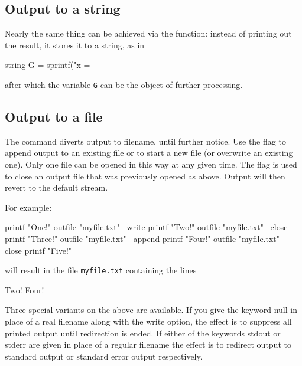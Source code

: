 \subsection{Output to a string}
\label{sec:sprintf}

Nearly the same thing can be achieved via the  function:
instead of printing out the result, it stores it to a string, as in 
\begin{code}
  string G = sprintf("x = %
\end{code}
after which the variable \texttt{G} can be the object of further
processing.


\subsection{Output to a file}
\label{sec:outfile}

The  command diverts output to filename, until further
notice. Use the flag  to append output to an existing
file or  to start a new file (or overwrite an existing
one). Only one file can be opened in this way at any given
time. The  flag is used to close an output file that was
previously opened as above. Output will then revert to the default
stream.

For example:
\begin{code}
  printf "One!\n"
  outfile "myfile.txt" --write
  printf "Two!\n"
  outfile "myfile.txt" --close
  printf "Three!\n"
  outfile "myfile.txt" --append
  printf "Four!\n"
  outfile "myfile.txt" --close
  printf "Five!\n"
\end{code}
will result in the file \texttt{myfile.txt} containing the lines
\begin{code}
Two!
Four!  
\end{code}

Three special variants on the above are available. If you give the
keyword null in place of a real filename along with the write option, the effect is to suppress all printed output until redirection
is ended. If either of the keywords stdout or stderr are given in
place of a regular filename the effect is to redirect output to
standard output or standard error output respectively.

